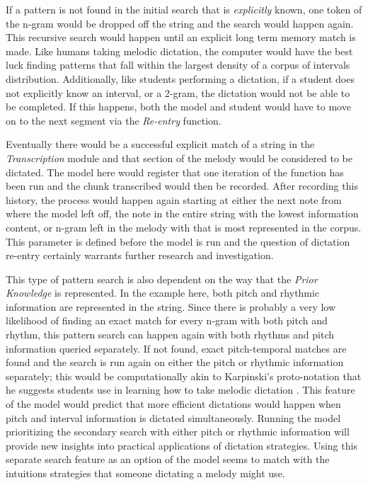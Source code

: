 \documentclass[]{book}
\theoremstyle{definition}
\theoremstyle{definition}
\theoremstyle{definition}
\theoremstyle{remark}
\begin{document}
If a pattern is not found in the initial search that is
\emph{explicitly} known, one token of the n-gram would be dropped off
the string and the search would happen again. This recursive search
would happen until an explicit long term memory match is made. Like
humans taking melodic dictation, the computer would have the best luck
finding patterns that fall within the largest density of a corpus of
intervals distribution. Additionally, like students performing a
dictation, if a student does not explicitly know an interval, or a
2-gram, the dictation would not be able to be completed. If this
happens, both the model and student would have to move on to the next
segment via the \emph{Re-entry} function.

Eventually there would be a successful explicit match of a string in the
\emph{Transcription} module and that section of the melody would be
considered to be dictated. The model here would register that one
iteration of the function has been run and the chunk transcribed would
then be recorded. After recording this history, the process would happen
again starting at either the next note from where the model left off,
the note in the entire string with the lowest information content, or
n-gram left in the melody with that is most represented in the corpus.
This parameter is defined before the model is run and the question of
dictation re-entry certainly warrants further research and
investigation.

This type of pattern search is also dependent on the way that the
\emph{Prior Knowledge} is represented. In the example here, both pitch
and rhythmic information are represented in the string. Since there is
probably a very low likelihood of finding an exact match for every
n-gram with both pitch and rhythm, this pattern search can happen again
with both rhythms and pitch information queried separately. If not
found, exact pitch-temporal matches are found and the search is run
again on either the pitch or rhythmic information separately; this would
be computationally akin to Karpinski's proto-notation that he suggests
students use in learning how to take melodic dictation
\citep[p.88]{karpinskiAuralSkillsAcquisition2000}. This feature of the
model would predict that more efficient dictations would happen when
pitch and interval information is dictated simultaneously. Running the
model prioritizing the secondary search with either pitch or rhythmic
information will provide new insights into practical applications of
dictation strategies. Using this separate search feature as an option of
the model seems to match with the intuitions strategies that someone
dictating a melody might use.
\end{document}

